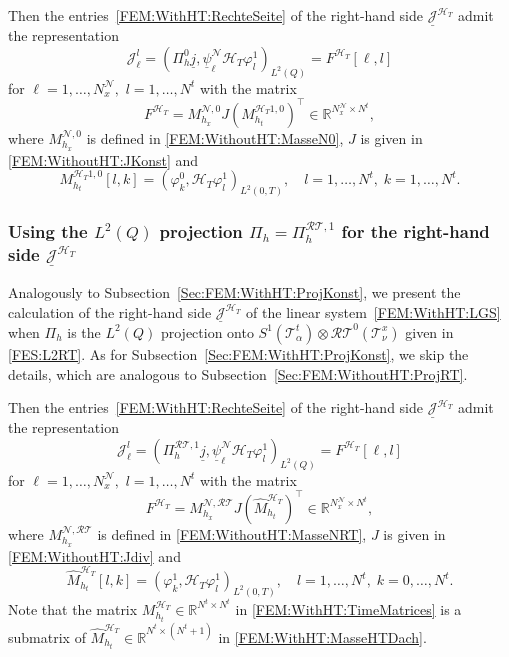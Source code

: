 \documentclass[a4paper,11pt]{article}
\newcommand{\R}{\mathbb R}
\renewcommand{\vec}[1]{\underline{#1}}
\begin{document}
Then the entries~\eqref{FEM:WithHT:RechteSeite} of the right-hand side $\vec{\mathcal J}^{\mathcal H_T}$ admit the representation
\begin{equation*}
	\mathcal J_\ell^l = (\Pi_h^0 \vec j, \vec \psi^\mathcal{N}_{\ell} \mathcal H_T \varphi^1_l)_{L^2(Q)} = F^{\mathcal H_T}[\ell,l]
\end{equation*}
for $\ell=1,\dots,N_x^{\mathcal{N}},$ $l = 1,\dots, N^t$ with the matrix
\begin{equation*}
	F^{\mathcal H_T} = M_{h_x}^{\mathcal{N},0} J (M_{h_t}^{\mathcal H_T1,0})^\top  \in \R^{N_x^{\mathcal{N}} \times N^t},
\end{equation*}
where $M_{h_x}^{\mathcal{N},0}$ is defined in \eqref{FEM:WithoutHT:MasseN0}, $J$ is given in \eqref{FEM:WithoutHT:JKonst} and
\begin{equation*}
	M_{h_t}^{\mathcal H_T1,0}[l,k] = (\varphi^0_k, \mathcal H_T \varphi^1_l)_{L^2(0,T)}, \quad l=1,\dots,N^t, \; k=1,\dots, N^t.
\end{equation*}


\subsubsection{Using the $L^2(Q)$ projection $\Pi_h=\Pi_h^{\mathcal{RT},1}$ for the right-hand side $\vec{\mathcal J}^{\mathcal H_T}$}

Analogously to Subsection~\ref{Sec:FEM:WithHT:ProjKonst}, we present the calculation of the right-hand side $\vec{\mathcal J}^{\mathcal H_T}$ of the linear system~\eqref{FEM:WithHT:LGS} when $\Pi_h$ is the $L^2(Q)$ projection onto $S^1(\mathcal T^t_\alpha) \otimes \mathcal{RT}^0(\mathcal T^x_\nu)$ given in \eqref{FES:L2RT}. As for Subsection~\ref{Sec:FEM:WithHT:ProjKonst}, we skip the details, which are analogous to Subsection~\ref{Sec:FEM:WithoutHT:ProjRT}.

Then the entries~\eqref{FEM:WithHT:RechteSeite}  of the right-hand side $\vec{\mathcal J}^{\mathcal H_T}$ admit the representation
\begin{equation*}
	\mathcal J_\ell^l = (\Pi_h^{\mathcal{RT},1} \vec j, \vec \psi^\mathcal{N}_{\ell} \mathcal H_T \varphi^1_l)_{L^2(Q)} = F^{\mathcal H_T}[\ell,l]
\end{equation*}
for  $\ell=1,\dots,N_x^{\mathcal{N}},$ $l = 1,\dots, N^t$ with the matrix
\begin{equation*}
	F^{\mathcal H_T} = M_{h_x}^{\mathcal{N},\mathcal{RT}} J (\widehat M_{h_t}^{\mathcal H_T})^\top  \in \R^{N_x^{\mathcal{N}} \times N^t},
\end{equation*}
where $M_{h_x}^{\mathcal{N},\mathcal{RT}}$ is defined in \eqref{FEM:WithoutHT:MasseNRT}, $J$ is given in \eqref{FEM:WithoutHT:Jdiv} and
\begin{equation}  \label{FEM:WithHT:MasseHTDach}
	\widehat M_{h_t}^{\mathcal H_T}[l,k] = (\varphi^1_k, \mathcal H_T \varphi^1_l)_{L^2(0,T)}, \quad  l=1,\dots,N^t, \; k=0,\dots, N^t.
\end{equation}
Note that the matrix $M_{h_t}^{\mathcal H_T} \in \R^{N^t \times N^t}$ in \eqref{FEM:WithHT:TimeMatrices} is a submatrix of $\widehat M_{h_t}^{\mathcal H_T} \in \R^{N^t \times (N^t+1)}$ in \eqref{FEM:WithHT:MasseHTDach}.
\end{document}
